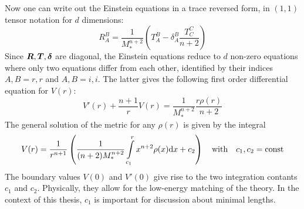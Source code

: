 \documentclass[12pt,a4paper]{report}
\numberwithin{equation}{chapter}
\begin{document}
Now one can write out the Einstein equations in a trace reversed form, in $(1,1)$ tensor notation for $d$ dimensions:
\begin{equation}
R^B_A = \frac{1}{M_*^{n+2}}
\left(
T^B_A - \delta^B_A
\frac{T^C_C}{n+2}
\right)
\end{equation}
Since ${\boldsymbol{ R }}, {\boldsymbol{ T }}, {\boldsymbol{ \delta }}$ are diagonal, the Einstein equations reduce to $d$ non-zero equations where only two equations differ from each other, identified by their indices $A,B=r,r$ and $A,B=i,i$. The latter gives the following first order differential equation for $V(r)$:
\begin{equation}
V'(r) + \frac{n+1}{r} V(r)
= \frac{1}{M_*^{n+2}} \frac{r \rho(r)}{n+2}
\end{equation}
The general solution of the metric for any $\rho(r)$ is given by the integral
\begin{equation}\label{eq:Rizzo-sol}
V(r) = \frac{1}{r^{n+1}}
\left(
\frac{1}{(n+2)M_*^{n+2}}
\int \limits_{c_1}^r
x^{n+2} \rho(x) \mathrm{d} x
+ c_2
\right)
\quad
\text{with} \quad c_1, c_2 = \operatorname{const}
\end{equation}
The boundary values $V(0)$ and $V'(0)$ give rise to the two integration contants $c_1$ and $c_2$. Physically, they allow for the low-energy matching of the theory. In the context of this thesis, $c_1$ is important for discussion about minimal lengths.
\end{document}
